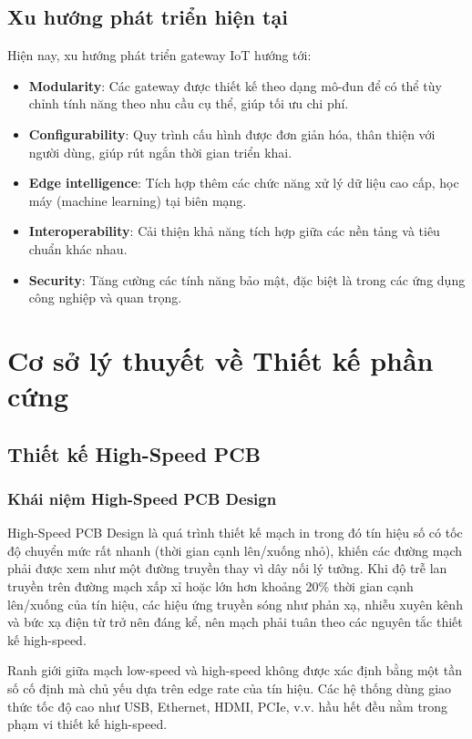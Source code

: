         \subsection{Xu hướng phát triển hiện tại}
            Hiện nay, xu hướng phát triển gateway IoT hướng tới:
            \begin{itemize}
                \item \textbf{Modularity}: Các gateway được thiết kế theo dạng mô-đun để có thể tùy chỉnh tính năng theo nhu cầu cụ thể, giúp tối ưu chi phí.
                \item \textbf{Configurability}: Quy trình cấu hình được đơn giản hóa, thân thiện với người dùng, giúp rút ngắn thời gian triển khai.
                \item \textbf{Edge intelligence}: Tích hợp thêm các chức năng xử lý dữ liệu cao cấp, học máy (machine learning) tại biên mạng.
                \item \textbf{Interoperability}: Cải thiện khả năng tích hợp giữa các nền tảng và tiêu chuẩn khác nhau.
                \item \textbf{Security}: Tăng cường các tính năng bảo mật, đặc biệt là trong các ứng dụng công nghiệp và quan trọng.
            \end{itemize}
        \section{Cơ sở lý thuyết về Thiết kế phần cứng}
            \subsection{Thiết kế High-Speed PCB}
                \subsubsection{Khái niệm High-Speed PCB Design}
                    High-Speed PCB Design là quá trình thiết kế mạch in trong đó tín hiệu số có tốc độ chuyển mức rất nhanh (thời gian cạnh lên/xuống nhỏ), khiến các đường mạch phải được xem như một đường truyền thay vì dây nối lý tưởng. Khi độ trễ lan truyền trên đường mạch xấp xỉ hoặc lớn hơn khoảng 20\% thời gian cạnh lên/xuống của tín hiệu, các hiệu ứng truyền sóng như phản xạ, nhiễu xuyên kênh và bức xạ điện từ trở nên đáng kể, nên mạch phải tuân theo các nguyên tắc thiết kế high-speed.
                    
                    Ranh giới giữa mạch low-speed và high-speed không được xác định bằng một tần số cố định mà chủ yếu dựa trên edge rate của tín hiệu. Các hệ thống dùng giao thức tốc độ cao như USB, Ethernet, HDMI, PCIe, v.v. hầu hết đều nằm trong phạm vi thiết kế high-speed.
                    
